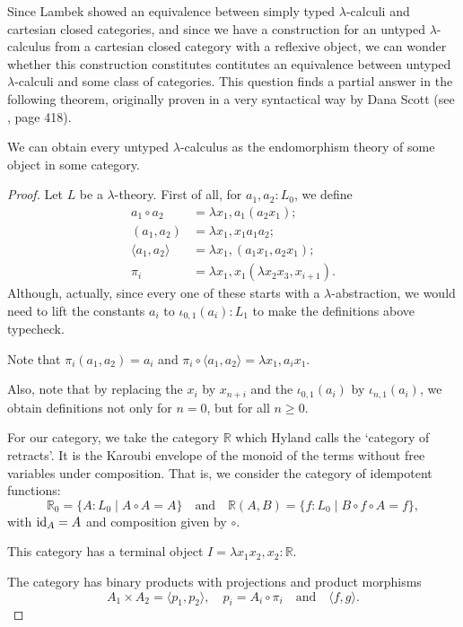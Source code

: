 Since Lambek showed an equivalence between simply typed $ \lambda $-calculi and cartesian closed categories, and since we have a construction for an untyped $ \lambda $-calculus from a cartesian closed category with a reflexive object, we can wonder whether this construction constitutes contitutes an equivalence between untyped $ \lambda $-calculi and some class of categories. This question finds a partial answer in the following theorem, originally proven in a very syntactical way by Dana Scott (see \cite{curry}, page 418).
\begin{lemma}
  We can obtain every untyped $ \lambda $-calculus as the endomorphism theory of some object in some category.
\end{lemma}
\begin{proof}
  Let $ L $ be a $ \lambda $-theory. First of all, for $ a_1, a_2: L_0 $, we define
  \begin{align*}
    a_1 \circ a_2 &= \lambda x_1, a_1 (a_2 x_1);\\
    (a_1, a_2) &= \lambda x_1, x_1 a_1 a_2;\\
    \langle a_1, a_2 \rangle &= \lambda x_1, (a_1 x_1, a_2 x_1);\\
    \pi_i &= \lambda x_1, x_1 (\lambda x_2 x_3, x_{i + 1}).
  \end{align*}
  Although, actually, since every one of these starts with a $ \lambda $-abstraction, we would need to lift the constants $ a_i $ to $ \iota_{0, 1}(a_i): L_1 $ to make the definitions above typecheck.

  Note that $ \pi_i (a_1, a_2) = a_i $ and $ \pi_i \circ \langle a_1, a_2 \rangle = \lambda x_1, a_i x_1 $.

  Also, note that by replacing the $ x_i $ by $ x_{n + i} $ and the $ \iota_{0, 1}(a_i) $ by $ \iota_{n, 1}(a_i) $, we obtain definitions not only for $ n = 0 $, but for all $ n \geq 0 $.

  For our category, we take the category $ \mathbb R $ which Hyland calls the `category of retracts'. It is the Karoubi envelope of the monoid of the terms without free variables under composition. That is, we consider the category of idempotent functions:
  \[ \mathbb R_0 = \{ A : L_0 \mid A \circ A = A \} \quad \text{and} \quad \mathbb R(A, B) = \{ f: L_0 \mid B \circ f \circ A = f \}, \]
  with $ \text{id}_{A} = A $ and composition given by $ \circ $.

  This category has a terminal object $ I = \lambda x_1 x_2, x_2 : \mathbb R $.

  The category has binary products with projections and product morphisms
  \[ A_1 \times A_2 = \langle p_1, p_2 \rangle, \quad p_i = A_i \circ \pi_i \quad \text{and} \quad \langle f, g \rangle. \]


\end{proof}
